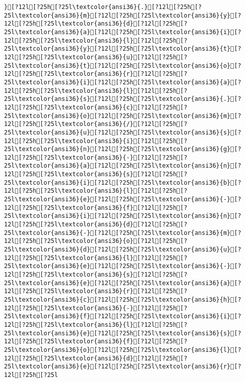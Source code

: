 \documentclass{scrartcl}
\begin{document}
\begin{Verbatim}
}[?12l[?25h[?25l\textcolor{ansi36}{.}[?12l[?25h[?25l\textcolor{ansi36}{m}[?12l[?25h[?25l\textcolor{ansi36}{y}[?12l[?25h[?25l\textcolor{ansi36}{d}[?12l[?25h[?25l\textcolor{ansi36}{a}[?12l[?25h[?25l\textcolor{ansi36}{i}[?12l[?25h[?25l\textcolor{ansi36}{l}[?12l[?25h[?25l\textcolor{ansi36}{y}[?12l[?25h[?25l\textcolor{ansi36}{t}[?12l[?25h[?25l\textcolor{ansi36}{u}[?12l[?25h[?25l\textcolor{ansi36}{t}[?12l[?25h[?25l\textcolor{ansi36}{o}[?12l[?25h[?25l\textcolor{ansi36}{r}[?12l[?25h[?25l\textcolor{ansi36}{i}[?12l[?25h[?25l\textcolor{ansi36}{a}[?12l[?25h[?25l\textcolor{ansi36}{l}[?12l[?25h[?25l\textcolor{ansi36}{s}[?12l[?25h[?25l\textcolor{ansi36}{.}[?12l[?25h[?25l\textcolor{ansi36}{c}[?12l[?25h[?25l\textcolor{ansi36}{o}[?12l[?25h[?25l\textcolor{ansi36}{m}[?12l[?25h[?25l\textcolor{ansi36}{/}[?12l[?25h[?25l\textcolor{ansi36}{u}[?12l[?25h[?25l\textcolor{ansi36}{s}[?12l[?25h[?25l\textcolor{ansi36}{i}[?12l[?25h[?25l\textcolor{ansi36}{n}[?12l[?25h[?25l\textcolor{ansi36}{g}[?12l[?25h[?25l\textcolor{ansi36}{-}[?12l[?25h[?25l\textcolor{ansi36}{a}[?12l[?25h[?25l\textcolor{ansi36}{n}[?12l[?25h[?25l\textcolor{ansi36}{s}[?12l[?25h[?25l\textcolor{ansi36}{i}[?12l[?25h[?25l\textcolor{ansi36}{b}[?12l[?25h[?25l\textcolor{ansi36}{l}[?12l[?25h[?25l\textcolor{ansi36}{e}[?12l[?25h[?25l\textcolor{ansi36}{-}[?12l[?25h[?25l\textcolor{ansi36}{f}[?12l[?25h[?25l\textcolor{ansi36}{i}[?12l[?25h[?25l\textcolor{ansi36}{n}[?12l[?25h[?25l\textcolor{ansi36}{d}[?12l[?25h[?25l\textcolor{ansi36}{-}[?12l[?25h[?25l\textcolor{ansi36}{m}[?12l[?25h[?25l\textcolor{ansi36}{o}[?12l[?25h[?25l\textcolor{ansi36}{d}[?12l[?25h[?25l\textcolor{ansi36}{u}[?12l[?25h[?25l\textcolor{ansi36}{l}[?12l[?25h[?25l\textcolor{ansi36}{e}[?12l[?25h[?25l\textcolor{ansi36}{-}[?12l[?25h[?25l\textcolor{ansi36}{s}[?12l[?25h[?25l\textcolor{ansi36}{e}[?12l[?25h[?25l\textcolor{ansi36}{a}[?12l[?25h[?25l\textcolor{ansi36}{r}[?12l[?25h[?25l\textcolor{ansi36}{c}[?12l[?25h[?25l\textcolor{ansi36}{h}[?12l[?25h[?25l\textcolor{ansi36}{-}[?12l[?25h[?25l\textcolor{ansi36}{f}[?12l[?25h[?25l\textcolor{ansi36}{i}[?12l[?25h[?25l\textcolor{ansi36}{l}[?12l[?25h[?25l\textcolor{ansi36}{e}[?12l[?25h[?25l\textcolor{ansi36}{s}[?12l[?25h[?25l\textcolor{ansi36}{f}[?12l[?25h[?25l\textcolor{ansi36}{o}[?12l[?25h[?25l\textcolor{ansi36}{l}[?12l[?25h[?25l\textcolor{ansi36}{d}[?12l[?25h[?25l\textcolor{ansi36}{e}[?12l[?25h[?25l\textcolor{ansi36}{r}[?12l[?25h[?25l

\end{Verbatim}
\end{document}
